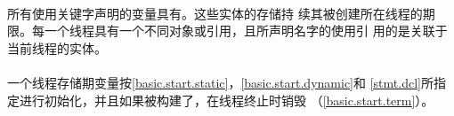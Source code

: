 \paragraph{} %
所有使用关键字声明的变量具有。这些实体的存储持
续其被创建所在线程的期限。每一个线程具有一个不同对象或引用，且所声明名字的使用引
用的是关联于当前线程的实体。

\paragraph{} %
\begin{note}
  一个线程存储期变量按\ref{basic.start.static}，\ref{basic.start.dynamic}和
  \ref{stmt.dcl}所指定进行初始化，并且如果被构建了，在线程终止时销毁
  （\ref{basic.start.term}）。
\end{note}
